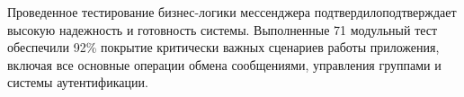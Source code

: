 Проведенное тестирование бизнес-логики мессенджера подтвердилоподтверждает высокую надежность и готовность системы. Выполненные 71 модульный тест обеспечили 92\% покрытие критически важных сценариев работы приложения, включая все основные операции обмена сообщениями, управления группами и системы аутентификации.